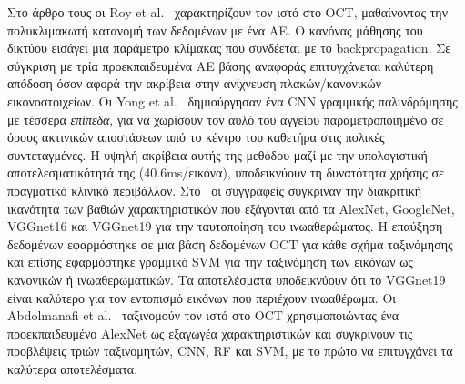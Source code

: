 Στο άρθρο τους οι Roy et al.~\cite{roy2016multiscale} χαρακτηρίζουν τον ιστό στο OCT, μαθαίνοντας την πολυκλιμακωτή κατανομή των δεδομένων με ένα AE\@.
Ο κανόνας μάθησης του δικτύου εισάγει μια παράμετρο κλίμακας που συνδέεται με το backpropagation.
Σε σύγκριση με τρία προεκπαιδευμένα ΑΕ βάσης αναφοράς επιτυγχάνεται καλύτερη απόδοση όσον αφορά την ακρίβεια στην ανίχνευση πλακών/κανονικών εικονοστοιχείων.
Οι Yong et al.~\cite{yong2017linear} δημιούργησαν ένα CNN γραμμικής παλινδρόμησης με τέσσερα \textit{επίπεδα}, για να χωρίσουν τον αυλό του αγγείου παραμετροποιημένο σε όρους ακτινικών αποστάσεων από το κέντρο του καθετήρα στις πολικές συντεταγμένες.
Η υψηλή ακρίβεια αυτής της μεθόδου μαζί με την υπολογιστική αποτελεσματικότητά της (40.6ms/εικόνα), υποδεικνύουν τη δυνατότητα χρήσης σε πραγματικό κλινικό περιβάλλον.
Στο~\cite{xu2017fibroatheroma} οι συγγραφείς σύγκριναν την διακριτική ικανότητα των βαθιών χαρακτηριστικών που εξάγονται από τα AlexNet, GoogleNet, VGGnet16 και VGGnet19 για την ταυτοποίηση του ινωαθερώματος.
Η επαύξηση δεδομένων εφαρμόστηκε σε μια βάση δεδομένων OCT για κάθε σχήμα ταξινόμησης και επίσης εφαρμόστηκε γραμμικό SVM για την ταξινόμηση των εικόνων ως κανονικών ή ινωαθερωματικών.
Τα αποτελέσματα υποδεικνύουν ότι το VGGnet19 είναι καλύτερο για τον εντοπισμό εικόνων που περιέχουν ινωαθέρωμα.
Οι Abdolmanafi et al.~\cite{abdolmanafi2017deep} ταξινομούν τον ιστό στο OCT χρησιμοποιώντας ένα προεκπαιδευμένο AlexNet ως εξαγωγέα χαρακτηριστικών και συγκρίνουν τις προβλέψεις τριών ταξινομητών, CNN, RF και SVM, με το πρώτο να επιτυγχάνει τα καλύτερα αποτελέσματα.

